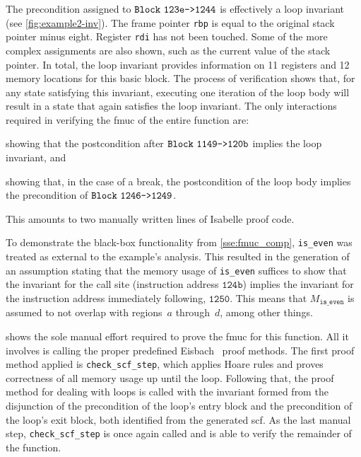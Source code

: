 The precondition assigned to $\texttt{Block}~\mathtt{123e\texttt{->}1244}$
is effectively a loop invariant (see \cref{fig:example2-inv}).%
The frame pointer \lstinline|rbp|%
is equal to the original stack pointer minus eight.%
Register \lstinline|rdi| has not been touched.
Some of the more complex assignments are also shown,
such as the current value of the stack pointer.
In total, the loop invariant provides information
on 11 registers and 12 memory locations for this basic block.%
The process of verification shows that,
for any state satisfying this invariant,
executing one iteration of the loop body
will result in a state that again satisfies the loop invariant.
The only interactions required in verifying the \ac{fmuc} of the entire function are:
\begin{enumerate*}
  \item showing that the postcondition after $\texttt{Block}~\mathtt{1149\texttt{->}120b}$
  implies the loop invariant, and
  \item showing that, in the case of a break, the postcondition of the loop body
  implies the precondition of $\texttt{Block}~\mathtt{1246\texttt{->}1249}$.
\end{enumerate*}
This amounts to two manually written lines of Isabelle proof code.  

To demonstrate the black-box functionality from \cref{sse:fmuc_comp},
\lstinline|is_even| was treated as external to the example's analysis.
This resulted in the generation of an assumption
stating that the memory usage of \lstinline|is_even| suffices to show that
the invariant for the call site (instruction address $\mathtt{124b}$)
implies the invariant for the instruction address immediately following,
$\mathtt{1250}$.
This means that $M_\mathtt{is\_even}$
is assumed to not overlap with regions~$a$ through~$d$, among other things.

 shows the sole manual effort required
to prove the \ac{fmuc} for this function.
All it involves is calling the proper predefined Eisbach~\citep{matichuk2016eisbach}
proof methods.
The first proof method applied is \lstinline|check_scf_step|,
which applies Hoare rules and proves correctness of all memory usage
up until the loop.
Following that, the proof method for dealing with loops
is called with the invariant formed from the disjunction
of the precondition of the loop's entry block
and the precondition of the loop's exit block,
both identified from the generated \ac{scf}.
As the last manual step, \lstinline|check_scf_step| is once again called
and is able to verify the remainder of the function.


